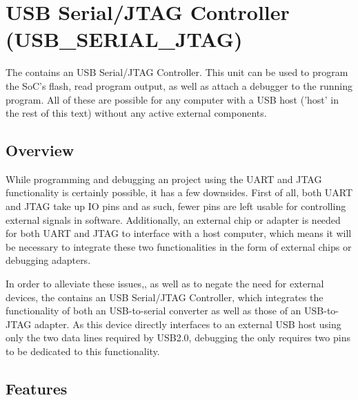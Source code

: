 \documentclass[main\_\_EN.tex]{subfiles}
\begin{document}

\ifglobal
\else
    {\let\clearpage\relax \listoftodos}
    \tableofcontents
\fi




\chapter{USB Serial/JTAG Controller (USB\_SERIAL\_JTAG)}
\label{mod:usbserialjtag}
\hypertarget{usbserialjtag}{}

The \chipname{} contains an USB Serial/JTAG Controller. This unit can be used to program the SoC's flash, read program output, as well as attach a debugger to the running program. All of these are possible for any computer with a USB host ('host' in the rest of this text) without any active external components.

\section{Overview}

While programming and debugging an \chipname{} project using the UART and JTAG functionality is certainly possible, it has a few downsides. First of all, both UART and JTAG take up IO pins and as such, fewer pins are left usable for controlling external signals in software. Additionally, an external chip or adapter is needed for both UART and JTAG to interface with a host computer, which means it will be necessary to integrate these two functionalities in the form of external chips or debugging adapters.

In order to alleviate these issues,, as well as to negate the need for external devices, the \chipname{} contains an USB Serial/JTAG Controller, which integrates the functionality of both an USB-to-serial converter as well as those of an USB-to-JTAG adapter. As this device directly interfaces to an external USB host using only the two data lines required by USB2.0, debugging the \chipname{} only requires two pins to be dedicated to this functionality.


\section{Features}
\label{sec:usbserialjtag-features}
\end{document}
